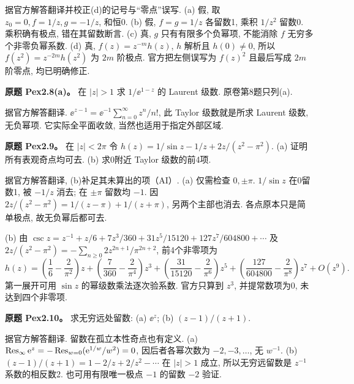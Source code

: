 \begin{solution}
据官方解答翻译并校正(d)的记号与“零点”误写. (a) 假, 取 $z_0=0,f=1/z,g=-1/z$, 和恒0. (b) 假, $f=g=1/z$ 各留数1, 乘积 $1/z^2$ 留数0. 乘积确有极点, 错在其留数断言. (c) 真, $g$ 只有有限多个负幂项, 不能消除 $f$ 无穷多个非零负幂系数. (d) 真, $f(z)=z^{-m}h(z)$, $h$ 解析且 $h(0)\ne0$, 所以 $f(z^2)=z^{-2m}h(z^2)$ 为 $2m$ 阶极点. 官方把左侧误写为 $f(z)^2$ 且最后写成 $2m$ 阶零点, 均已明确修正.
\end{solution}
\begin{exercise}\label{ass:pex2-8}
\textbf{原题 Pex2.8(a)。} 在 $|z|>1$ 求 $1/\ee^{1-z}$ 的 Laurent 级数. 原卷第8题只列(a).
\end{exercise}
\begin{solution}据官方解答翻译. $\ee^{z-1}=\ee^{-1}\sum_{n=0}^{\infty}z^n/n!$, 此 Taylor 级数就是所求 Laurent 级数, 无负幂项. 它实际全平面收敛, 当然也适用于指定外部区域.\end{solution}
\begin{exercise}\label{ass:pex2-9}
\textbf{原题 Pex2.9。} 在 $|z|<2\pi$ 令 $h(z)=1/\sin z-1/z+2z/(z^2-\pi^2)$. (a) 证明所有表观奇点均可去. (b) 求0附近 Taylor 级数的前4项.
\end{exercise}
\begin{solution}
据官方解答翻译, (b)补足其未算出的项（AI）. (a) 仅需检查 $0,\pm\pi$. $1/\sin z$ 在0留数1, 被 $-1/z$ 消去; 在 $\pm\pi$ 留数均 $-1$. 因 $2z/(z^2-\pi^2)=1/(z-\pi)+1/(z+\pi)$, 另两个主部也消去. 各点原本只是简单极点, 故无负幂后都可去.

(b) 由 $\csc z=z^{-1}+z/6+7z^3/360+31z^5/15120+127z^7/604800+\cdots$ 及 $2z/(z^2-\pi^2)=-\sum_{n\ge0}2z^{2n+1}/\pi^{2n+2}$, 前4个非零项为
\[
h(z)=\left(\frac16-\frac2{\pi^2}\right)z+
\left(\frac7{360}-\frac2{\pi^4}\right)z^3+
\left(\frac{31}{15120}-\frac2{\pi^6}\right)z^5+
\left(\frac{127}{604800}-\frac2{\pi^8}\right)z^7+O(z^9).
\]
第一展开可用 $\sin z$ 的幂级数乘法逐次验系数. 官方只算到 $z^3$, 并提常数项为0, 未达到四个非零项.
\end{solution}
\begin{exercise}\label{ass:pex2-10}
\textbf{原题 Pex2.10。} 求无穷远处留数: (a) $\ee^z$; (b) $(z-1)/(z+1)$.
\end{exercise}
\begin{solution}
据官方解答翻译. 留数在孤立本性奇点也有定义. (a) $\operatorname{Res}_\infty\mathrm e^z=-\operatorname{Res}_{w=0}(\mathrm e^{1/w}/w^2)=0$, 因后者各幂次数为 $-2,-3,\ldots$, 无 $w^{-1}$. (b) $(z-1)/(z+1)=1-2/z+2/z^2-\cdots$ 在 $|z|>1$ 成立, 所以无穷远留数是 $z^{-1}$ 系数的相反数2. 也可用有限唯一极点 $-1$ 的留数 $-2$ 验证.
\end{solution}
